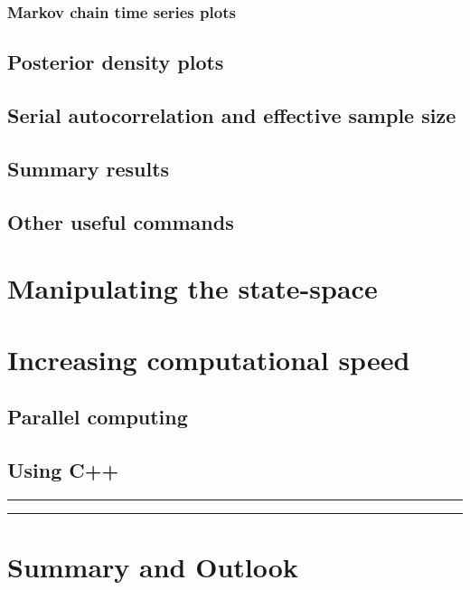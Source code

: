 \subsubsection{Markov chain time series plots}

\begin{figure}[ht]
\begin{center}
\end{center}
\label{mcmc.fig.timeseries}
\end{figure}



\subsection{Posterior density plots}

\begin{figure}[ht]
\begin{center}
\end{center}
\label{mcmc.fig.timeseries2}
\end{figure}

\subsection{Serial autocorrelation and effective sample size}


\subsection{Summary results}
\label{mcmc.sec.mcmcsummary}


\subsection{Other useful commands }

\section{Manipulating the state-space}
\label{mcmc.sec.state-space}


\begin{figure}[ht]
\begin{center}
\end{center}
\label{mcmc.fig.raccooncamera}
\end{figure}

  

\section{Increasing computational speed}

\subsection{Parallel computing}


\subsection{Using {\bf C++}}

\begin{panel}[ht]
\centering
\rule[0.15in]{\textwidth}{.03in}
\rule[-0.15in]{\textwidth}{.03in}
\label{mcmc.panel.C1}
\end{panel}

\section{Summary and Outlook}
